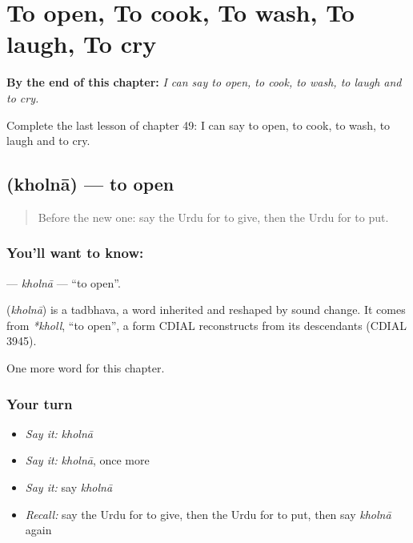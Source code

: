 
\chapter{To open, To cook, To wash, To laugh, To cry}
\label{ch:ur-to-open-to-cook-to-wash-to-laugh-to-cry}

\begin{chapteropening}
\textbf{By the end of this chapter:} \emph{I can say to open, to cook, to wash, to laugh and to cry.}

Complete the last lesson of chapter 49: I can say to open, to cook, to wash, to laugh and to cry.
\end{chapteropening}

\section[\texorpdfstring{\ur{کھولنا} (kholnā)}{کھولنا (kholnā)}]{ (kholnā) — to open}

\label{lesson:UR-C49-kholna}



\begin{quote}
Before the new one: say the Urdu for to give, then the Urdu for to put.
\end{quote}

\subsection*{You'll want to know: }
\textbf{} — \emph{kholnā} — \textquotedblleft{}to open\textquotedblright{}.

\begin{cousinweb}
\textbf{} (\emph{kholnā}) is a tadbhava, a word inherited and reshaped by sound change. It comes from \emph{*kholl}, \textquotedblleft{}to open\textquotedblright{}, a form CDIAL reconstructs from its descendants (CDIAL 3945).
\end{cousinweb}

\begin{grammarlens}[title={What you've built}]
One more word for this chapter.
\end{grammarlens}

\subsection*{Your turn}
\begin{itemize}
\raggedright
  \item \emph{Say it:} \emph{kholnā}
  \item \emph{Say it:} \emph{kholnā}, once more
  \item \emph{Say it:} say \emph{kholnā}
  \item \emph{Recall:} say the Urdu for to give, then the Urdu for to put, then say \emph{kholnā} again
\end{itemize}

